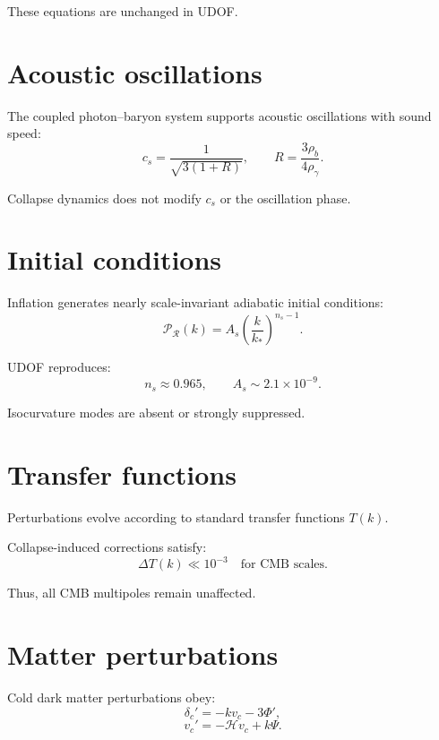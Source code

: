 \documentclass[11pt]{book}
\begin{document}
These equations are unchanged in UDOF.

\section{Acoustic oscillations}

The coupled photon--baryon system supports acoustic oscillations with
sound speed:
\begin{equation}
c_s = \frac{1}{\sqrt{3(1+R)}},
\qquad
R = \frac{3\rho_b}{4\rho_\gamma}.
\end{equation}

Collapse dynamics does not modify $c_s$ or the oscillation phase.

\section{Initial conditions}

Inflation generates nearly scale-invariant adiabatic initial conditions:
\begin{equation}
\mathcal{P}_\mathcal{R}(k) = A_s
\left(\frac{k}{k_\ast}\right)^{n_s - 1}.
\end{equation}

UDOF reproduces:
\begin{equation}
n_s \approx 0.965,
\qquad
A_s \sim 2.1\times10^{-9}.
\end{equation}

Isocurvature modes are absent or strongly suppressed.

\section{Transfer functions}

Perturbations evolve according to standard transfer functions $T(k)$.

Collapse-induced corrections satisfy:
\begin{equation}
\Delta T(k) \ll 10^{-3}
\quad
\text{for CMB scales}.
\end{equation}

Thus, all CMB multipoles remain unaffected.

\section{Matter perturbations}

Cold dark matter perturbations obey:
\begin{equation}
\delta_c' = -k v_c - 3\Phi',
\end{equation}
\begin{equation}
v_c' = -\mathcal{H} v_c + k\Psi.
\end{equation}
\end{document}
